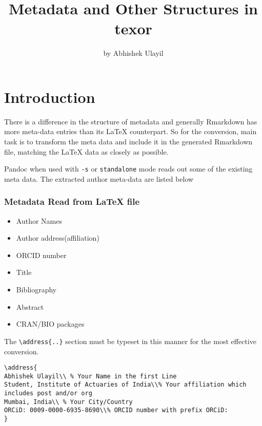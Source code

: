 \title{Metadata and Other Structures in texor}
\author{by Abhishek Ulayil}

\maketitle


\section{Introduction}
There is a difference in the structure of metadata and generally Rmarkdown has more
meta-data entries than its LaTeX counterpart. So for the conversion, main task is to 
transform the meta data and include it in the generated Rmarkdown file, matching the
LaTeX data as closely as possible.

Pandoc when used with \verb|-s| or \verb|standalone| mode reads out some of the existing
meta data. The extracted author meta-data are listed below

\subsubsection{Metadata Read from LaTeX file}

\begin{itemize}
  \item Author Names 
  \item Author address(affiliation)
  \item ORCID number
  \item Title
  \item Bibliography
  \item Abstract
  \item CRAN/BIO packages
\end{itemize}

The \verb|\address{..}| section must be typeset in this manner for the most 
effective conversion.
\begin{verbatim}
\address{
Abhishek Ulayil\\ % Your Name in the first Line
Student, Institute of Actuaries of India\\% Your affiliation which includes post and/or org
Mumbai, India\\ % Your City/Country
ORCiD: 0009-0000-6935-8690\\% ORCID number with prefix ORCiD: 
}
\end{verbatim}

